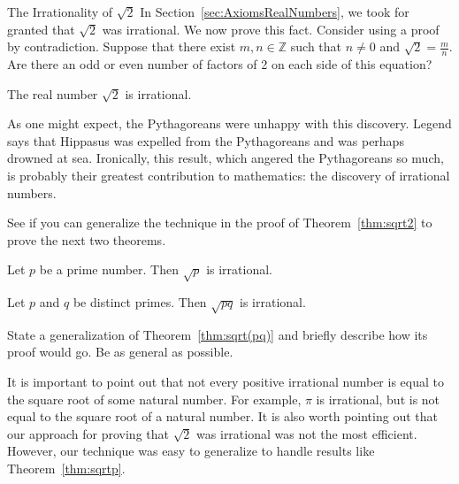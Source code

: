 \begin{section}{The Irrationality of $\sqrt{2}$}
In Section~\ref{sec:AxiomsRealNumbers}, we took for granted that $\sqrt{2}$ was irrational.  We now prove this fact. Consider using a proof by contradiction. Suppose that there exist $m,n\in\mathbb{Z}$ such that $n\ne 0$ and $\sqrt{2}=\frac{m}{n}$. Are there an odd or even number of factors of 2 on each side of this equation?

\begin{theorem}\label{thm:sqrt2}
The real number $\sqrt{2}$ is irrational.
\end{theorem}

As one might expect, the Pythagoreans were unhappy with this discovery. Legend says that Hippasus was expelled from the Pythagoreans and was perhaps drowned at sea. Ironically, this result, which angered the Pythagoreans so much, is probably their greatest contribution to mathematics: the discovery of irrational numbers.

See if you can generalize the technique in the proof of Theorem~\ref{thm:sqrt2} to prove the next two theorems.

\begin{theorem}\label{thm:sqrtp}
Let $p$ be a prime number.  Then $\sqrt{p}$ is irrational.
\end{theorem}

\begin{theorem}\label{thm:sqrt(pq)}
Let $p$ and $q$ be distinct primes.  Then $\sqrt{pq}$ is irrational.
\end{theorem}

\begin{problem}
State a generalization of Theorem~\ref{thm:sqrt(pq)} and briefly describe how its proof would go.  Be as general as possible.
\end{problem}

It is important to point out that not every positive irrational number is equal to the square root of some natural number.  For example, $\pi$ is irrational, but is not equal to the square root of a natural number. It is also worth pointing out that our approach for proving that $\sqrt{2}$ was irrational was not the most efficient.  However, our technique was easy to generalize to handle results like Theorem~\ref{thm:sqrtp}.

\end{section}
